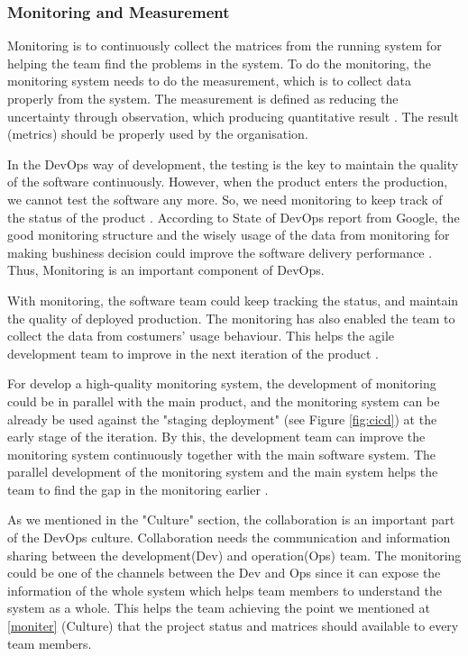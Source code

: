 \subsubsection[]{Monitoring and Measurement}
Monitoring is to continuously collect the matrices from the running system for helping the team find the problems in the system. To do the monitoring, the monitoring system needs to do the measurement, which is to collect data properly from the system. The measurement is defined as reducing the uncertainty through observation, which producing quantitative result \cite{hering2015measure}. The result (metrics) should be properly used by the organisation.
\par
In the DevOps way of development, the testing is the key to maintain the quality of the software continuously. However, when the product enters the production, we cannot test the software any more. So, we need monitoring to keep track of the status of the product \cite{huttermann2012devops}. According to State of DevOps report from Google, the good monitoring structure and the wisely usage of the data from monitoring for making bushiness decision could improve the software delivery performance \cite{forsgrenaccelerate}. Thus, Monitoring is an important component of DevOps.
\par
With monitoring, the software team could keep tracking the status, and maintain the quality of deployed production. The monitoring has also enabled the team to collect the data from costumers' usage behaviour. This helps the agile development team to improve in the next iteration of the product \cite{lwakatare2015dimensions}.
\par
For develop a high-quality monitoring system, the development of monitoring could be in parallel with the main product, and the monitoring system can be already be used against the "staging deployment" (see Figure \ref{fig:cicd}) at the early stage of the iteration. By this, the development team can improve the monitoring system continuously together with the main software system. The parallel development of the monitoring system and the main system helps the team to find the gap in the monitoring earlier \cite{huttermann2012devops}.
\par
As we mentioned in the "Culture" section, the collaboration is an important part of the DevOps culture. Collaboration needs the communication and information sharing between the development(Dev) and operation(Ops) team. The monitoring could be one of the channels between the Dev and Ops since it can expose the information of the whole system which helps team members to understand the system as a whole. This helps the team achieving the point we mentioned at \ref{moniter} (Culture) that the project status and matrices should available to every team members.

